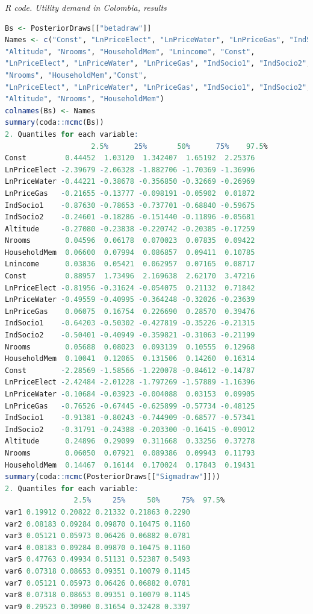 \begin{tcolorbox}[enhanced,width=4.67in,center upper,
	fontupper=\large\bfseries,drop shadow southwest,sharp corners]
	\textit{R code. Utility demand in Colombia, results}
	\begin{VF}
		\begin{lstlisting}[language=R]
Bs <- PosteriorDraws[["betadraw"]]
Names <- c("Const", "LnPriceElect", "LnPriceWater", "LnPriceGas", "IndSocio1", "IndSocio2", 
"Altitude", "Nrooms", "HouseholdMem", "Lnincome", "Const",
"LnPriceElect", "LnPriceWater", "LnPriceGas", "IndSocio1", "IndSocio2", 
"Nrooms", "HouseholdMem","Const",
"LnPriceElect", "LnPriceWater", "LnPriceGas", "IndSocio1", "IndSocio2", 
"Altitude", "Nrooms", "HouseholdMem")
colnames(Bs) <- Names
summary(coda::mcmc(Bs))
2. Quantiles for each variable:
					2.5%      25%       50%      75%    97.5%
Const         0.44452  1.03120  1.342407  1.65192  2.25376
LnPriceElect -2.39679 -2.06328 -1.882706 -1.70369 -1.36996
LnPriceWater -0.44221 -0.38678 -0.356850 -0.32669 -0.26969
LnPriceGas   -0.21655 -0.13777 -0.098191 -0.05902  0.01872
IndSocio1    -0.87630 -0.78653 -0.737701 -0.68840 -0.59675
IndSocio2    -0.24601 -0.18286 -0.151440 -0.11896 -0.05681
Altitude     -0.27080 -0.23838 -0.220742 -0.20385 -0.17259
Nrooms        0.04596  0.06178  0.070023  0.07835  0.09422
HouseholdMem  0.06600  0.07994  0.086857  0.09411  0.10785
Lnincome      0.03836  0.05421  0.062957  0.07165  0.08717
Const         0.88957  1.73496  2.169638  2.62170  3.47216
LnPriceElect -0.81956 -0.31624 -0.054075  0.21132  0.71842
LnPriceWater -0.49559 -0.40995 -0.364248 -0.32026 -0.23639
LnPriceGas    0.06075  0.16754  0.226690  0.28570  0.39476
IndSocio1    -0.64203 -0.50302 -0.427819 -0.35226 -0.21315
IndSocio2    -0.50401 -0.40949 -0.359821 -0.31063 -0.21199
Nrooms        0.05688  0.08023  0.093139  0.10555  0.12968
HouseholdMem  0.10041  0.12065  0.131506  0.14260  0.16314
Const        -2.28569 -1.58566 -1.220078 -0.84612 -0.14787
LnPriceElect -2.42484 -2.01228 -1.797269 -1.57889 -1.16396
LnPriceWater -0.10684 -0.03923 -0.004088  0.03153  0.09905
LnPriceGas   -0.76526 -0.67445 -0.625899 -0.57734 -0.48125
IndSocio1    -0.91381 -0.80243 -0.744909 -0.68577 -0.57341
IndSocio2    -0.31791 -0.24388 -0.203300 -0.16415 -0.09012
Altitude      0.24896  0.29099  0.311668  0.33256  0.37278
Nrooms        0.06050  0.07921  0.089386  0.09943  0.11793
HouseholdMem  0.14467  0.16144  0.170024  0.17843  0.19431
summary(coda::mcmc(PosteriorDraws[["Sigmadraw"]]))
2. Quantiles for each variable:
				2.5%     25%     50%     75%  97.5%
var1 0.19912 0.20822 0.21332 0.21863 0.2290
var2 0.08183 0.09284 0.09870 0.10475 0.1160
var3 0.05121 0.05973 0.06426 0.06882 0.0781
var4 0.08183 0.09284 0.09870 0.10475 0.1160
var5 0.47763 0.49934 0.51131 0.52387 0.5493
var6 0.07318 0.08653 0.09351 0.10079 0.1145
var7 0.05121 0.05973 0.06426 0.06882 0.0781
var8 0.07318 0.08653 0.09351 0.10079 0.1145
var9 0.29523 0.30900 0.31654 0.32428 0.3397
\end{lstlisting}
	\end{VF}
\end{tcolorbox}


